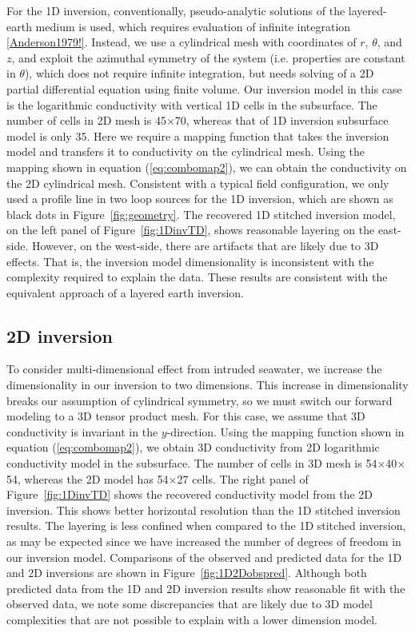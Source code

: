 \documentclass{segabs}
\begin{document}
For the 1D inversion, conventionally, pseudo-analytic solutions of the layered-earth medium is used, which requires evaluation of infinite integration \ref{Anderson1979!}. Instead, we use a cylindrical mesh with coordinates of $r$, $\theta$, and $z$, and exploit the azimuthal symmetry of the system (i.e. properties are constant in $\theta$), which does not require infinite integration, but needs solving of a 2D partial differential equation using finite volume.  Our inversion model in this case is the logarithmic conductivity with vertical 1D cells in the subsurface. The number of cells in 2D mesh is  45$\times$70, whereas that of 1D inversion subsurface model is only 35. Here we require a mapping function that takes the inversion model and transfers it to conductivity on the cylindrical mesh. Using the mapping shown in equation (\ref{eq:combomap2}), we can obtain the conductivity on the 2D cylindrical mesh. Consistent with a typical field configuration, we only used a profile line in two loop sources for the 1D inversion, which are shown as black dots in Figure~\ref{fig:geometry}. The recovered 1D stitched inversion model, on the left panel of Figure~\ref{fig:1DinvTD}, shows reasonable layering on the east-side. However, on the west-side, there are artifacts that are likely due to 3D effects. That is, the inversion model dimensionality is inconsistent with the complexity required to explain the data. These results are consistent with the equivalent approach of a layered earth inversion.

\subsection*{2D inversion}
To consider multi-dimensional effect from intruded seawater, we increase the dimensionality in our inversion to two dimensions. This increase in dimensionality breaks our assumption of cylindrical symmetry, so we must switch our forward modeling to a 3D tensor product mesh. For this case, we assume that 3D conductivity is invariant in the $y$-direction. Using the mapping function shown in equation (\ref{eq:combomap2}), we obtain 3D conductivity from 2D logarithmic conductivity model in the subsurface. The number of cells in 3D mesh is 54$\times$40$\times$54, whereas the 2D model has 54$\times$27 cells. The right panel of Figure~\ref{fig:1DinvTD} shows the recovered conductivity model from the 2D inversion. This shows better horizontal resolution than the 1D stitched inversion results. The layering is less confined when compared to the 1D stitched inversion, as may be expected since we have increased the number of degrees of freedom in our inversion model. Comparisons of the observed and predicted data for the 1D and 2D inversions are shown in Figure~\ref{fig:1D2Dobspred}. Although both predicted data from the 1D and 2D inversion results show reasonable fit with the observed data, we note some discrepancies that are likely due to 3D model complexities that are not possible to explain with a lower dimension model.
\end{document}
